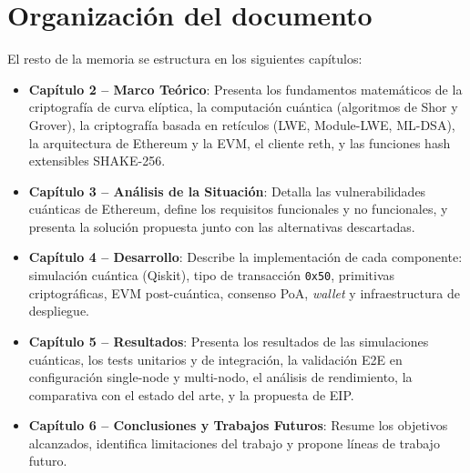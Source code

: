 \section{Organización del documento}

El resto de la memoria se estructura en los siguientes capítulos:

\begin{itemize}
  \item \textbf{Capítulo 2 -- Marco Teórico}: Presenta los fundamentos matemáticos de la criptografía de curva elíptica, la computación cuántica (algoritmos de Shor y Grover), la criptografía basada en retículos (LWE, Module-LWE, ML-DSA), la arquitectura de Ethereum y la EVM, el cliente reth, y las funciones hash extensibles SHAKE-256.
  
  \item \textbf{Capítulo 3 -- Análisis de la Situación}: Detalla las vulnerabilidades cuánticas de Ethereum, define los requisitos funcionales y no funcionales, y presenta la solución propuesta junto con las alternativas descartadas.
  
  \item \textbf{Capítulo 4 -- Desarrollo}: Describe la implementación de cada componente: simulación cuántica (Qiskit), tipo de transacción \texttt{0x50}, primitivas criptográficas, EVM post-cuántica, consenso PoA, \emph{wallet} y infraestructura de despliegue.
  
  \item \textbf{Capítulo 5 -- Resultados}: Presenta los resultados de las simulaciones cuánticas, los tests unitarios y de integración, la validación E2E en configuración single-node y multi-nodo, el análisis de rendimiento, la comparativa con el estado del arte, y la propuesta de EIP.
  
  \item \textbf{Capítulo 6 -- Conclusiones y Trabajos Futuros}: Resume los objetivos alcanzados, identifica limitaciones del trabajo y propone líneas de trabajo futuro.
\end{itemize}
